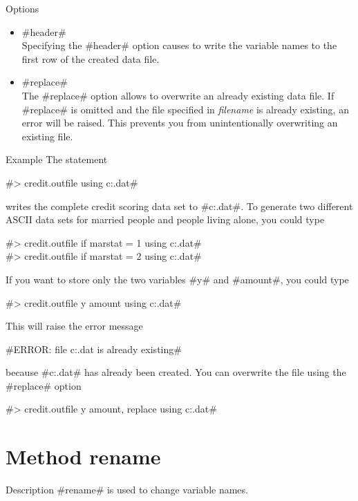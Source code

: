 \begin{stanza}{Options}
\begin{itemize}
\item #header# \\
Specifying the #header# option causes \BayesX to write the variable names to the first row of the created data file.
\item #replace# \\
The #replace# option allows \BayesX to overwrite an already existing data file. If #replace# is omitted and the file specified in {\em filename} is already existing, an error will be raised. This prevents you from unintentionally overwriting an existing file.
\end{itemize}
\end{stanza}

\begin{stanza}{Example}
The statement

#> credit.outfile using c:\data\cr.dat#

writes the complete credit scoring data set to #c:\data\cr.dat#. To generate two different ASCII data sets for married people and people living alone, you could type

#> credit.outfile if marstat = 1 using c:\data\crmarried.dat# \\
#> credit.outfile if marstat = 2 using c:\data\cralone.dat#

If you want to store only the two variables #y# and #amount#, you could type

#> credit.outfile y amount using c:\data\cr.dat#

This will raise the error message

#ERROR: file c:\data\cr.dat is already existing#

because #c:\data\cr.dat# has already been created. You can overwrite the file using the #replace# option

#> credit.outfile y amount, replace using c:\data\cr.dat#
\end{stanza}


\section{Method rename}
 \label{rename}

\begin{stanza}{Description}
#rename# is used to change variable names.
\end{stanza}

